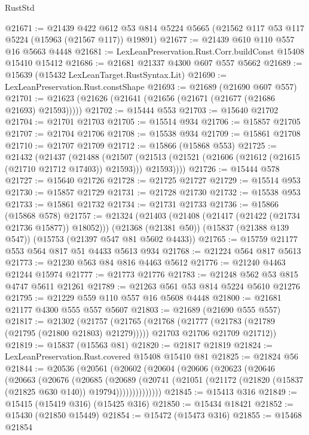 \begin{lexlean}{RustStd}
\begin{coremodule}
@21671 := @21439
    @422
    @612
    @53
    @814
    @5224
    @5665
    (@21562 @117 @53 @117 @5224 (@15963 (@21567 @117)) @19891)
@21677 := @21439 @610 @110 @557 @16 @5663 @4448
@21681 := LexLeanPreservation.Rust.Corr.buildConst @15408 @15410 @15412
@21686 := @21681 @21337 @4300 @607 @557 @5662
@21689 := @15639 (@15432 LexLeanTarget.RustSyntax.Lit)
@21690 := LexLeanPreservation.Rust.constShape
@21693 := @21689 (@21690 @607 @557)
@21701 := @21623 (@21626 (@21641 (@21656 (@21671 (@21677 (@21686 @21693) @21593)))))
@21702 := @15444 @553
@21703 := @15640 @21702
@21704 := @21701 @21703
@21705 := @15514 @934
@21706 := @15857 @21705
@21707 := @21704 @21706
@21708 := @15538 @934
@21709 := @15861 @21708
@21710 := @21707 @21709
@21712 := @15866 (@15868 @553)
@21725 := @21432
    (@21437
      (@21488
        (@21507 (@21513 (@21521 (@21606 (@21612 (@21615 (@21710 @21712 @17403)) @21593))) @21593))))
@21726 := @15444 @578
@21727 := @15640 @21726
@21728 := @21725 @21727
@21729 := @15514 @953
@21730 := @15857 @21729
@21731 := @21728 @21730
@21732 := @15538 @953
@21733 := @15861 @21732
@21734 := @21731 @21733
@21736 := @15866 (@15868 @578)
@21757 := @21324
    (@21403 (@21408 (@21417 (@21422 (@21734 @21736 @15877)) @18052)))
    (@21368 (@21381 @50))
    (@15837 (@21388 @139 @547))
    (@15753 (@21397 @547 @81 @5602 @4433))
@21765 := @15759 @21177 @553 @564 @817 @51 @4433 @5613 @934
@21768 := @21224 @564 @817 @5613
@21773 := @21230 @563 @84 @816 @4463 @5612
@21776 := @21240 @4463 @21244 @15974
@21777 := @21773 @21776
@21783 := @21248 @562 @53 @815 @4747 @5611 @21261
@21789 := @21263 @561 @53 @814 @5224 @5610 @21276
@21795 := @21229 @559 @110 @557 @16 @5608 @4448
@21800 := @21681 @21177 @4300 @555 @557 @5607
@21803 := @21689 (@21690 @555 @557)
@21817 := @21302
    (@21757
      (@21765
        (@21768 (@21777 (@21783 (@21789 (@21795 (@21800 @21803) @21279)))))
        @21703
        @21706
        @21709
        @21712))
@21819 := @15837 (@15563 @81)
@21820 := @21817 @21819
@21824 := LexLeanPreservation.Rust.covered @15408 @15410 @81
@21825 := @21824 @56
@21844 := @20536
    (@20561
      (@20602
        (@20604
          (@20606
            (@20623
              (@20646
                (@20663
                  (@20676
                    (@20685
                      (@20689
                        (@20741
                          (@21051 (@21172 (@21820 (@15837 (@21825 @630 @140)) @19794))))))))))))))
@21845 := @15413 @316
@21849 := @15415 (@15419 @316) (@15425 @316)
@21850 := @15434 @18421
@21852 := @15430 (@21850 @15449)
@21854 := @15472 (@15473 @316)
@21855 := @15468 @21854

\end{coremodule}
\end{lexlean}
